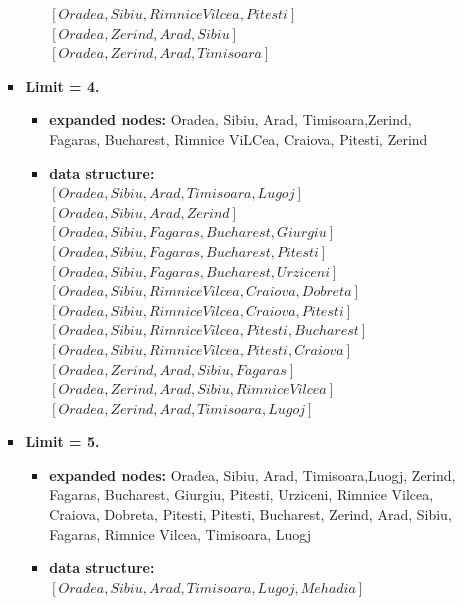 \documentclass{article}%
\begin{document}
\begin{enumerate}
\begin{enumerate}
\begin{itemize}
\begin{itemize}
			$\left[ Oradea, Sibiu, Rimnice Vilcea, Pitesti \right]$ \\
			$ \left[ Oradea, Zerind, Arad, Sibiu\right]$ \\ 
			$\left[ Oradea, Zerind, Arad, Timisoara\right] $ 
			\end{itemize}
		\item \textbf{Limit = 4.} 
			\begin{itemize}
			\item \textbf{expanded nodes:} Oradea, Sibiu, Arad, Timisoara,Zerind, Fagaras, Bucharest, Rimnice ViLCea, Craiova, Pitesti, Zerind
			\item \textbf{data structure:} \\
			$\left[ Oradea, Sibiu, Arad,Timisoara, Lugoj \right]$ \\ 
		    $\left[ Oradea, Sibiu, Arad,Zerind \right]$ \\ 
			$ \left[ Oradea, Sibiu, Fagaras, Bucharest, Giurgiu \right]$ \\ 
			$\left[ Oradea, Sibiu, Fagaras, Bucharest, Pitesti \right]$ \\ 
			$ \left[ Oradea, Sibiu, Fagaras, Bucharest, Urziceni \right]$ \\
			$ \left[ Oradea, Sibiu, Rimnice Vilcea, Craiova,Dobreta \right]$ \\ 
			$ \left[ Oradea, Sibiu, Rimnice Vilcea, Craiova,Pitesti \right]$ \\ 
			$\left[ Oradea, Sibiu, Rimnice Vilcea, Pitesti, Bucharest \right] $ \\
			$\left[ Oradea, Sibiu, Rimnice Vilcea, Pitesti, Craiova \right]$ \\
			$ \left[ Oradea, Zerind, Arad, Sibiu, Fagaras\right]$ \\ 
			$\left[ Oradea, Zerind, Arad, Sibiu, Rimnice Vilcea\right]$ \\
			$\left[ Oradea, Zerind, Arad, Timisoara, Lugoj\right] $ 
			\end{itemize}
		\item \textbf{Limit = 5.} 
			\begin{itemize}
			\item \textbf{expanded nodes:} Oradea, Sibiu, Arad, Timisoara,Luogj, Zerind, Fagaras, Bucharest, Giurgiu, Pitesti, Urziceni, Rimnice Vilcea, Craiova, Dobreta, Pitesti, Pitesti, Bucharest, Zerind, Arad, Sibiu, Fagaras, Rimnice Vilcea, Timisoara, Luogj 
			\item \textbf{data structure:} \\
			$\left[ Oradea, Sibiu, Arad,Timisoara, Lugoj, Mehadia \right]$ \\ 

\end{itemize}
\end{itemize}
\end{enumerate}
\end{enumerate}
\end{document}

